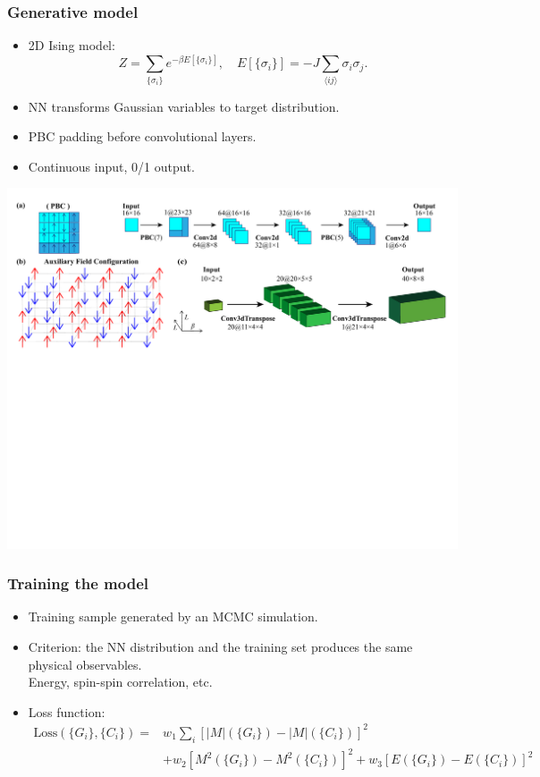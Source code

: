 \documentclass[xcolor=table, 10pt, aspectratio=169, ignorenonframetext]{beamer}
\begin{document}
\begin{frame}
  \frametitle{Generative model}
  \begin{itemize}
  \item 2D Ising model:
    \[Z=\sum_{\{\sigma_i\}}e^{-\beta E[\{\sigma_i\}]},\quad
      E[\{\sigma_i\}]=-J\sum_{\langle ij\rangle} \sigma_i\sigma_j.\]
  \item NN transforms Gaussian variables to target distribution.
  \item PBC padding before convolutional layers.
  \item Continuous input, 0/1 output.
  \end{itemize}
  \begin{center}
    \includegraphics[width=14cm]{nn-model1}
  \end{center}
\end{frame}

\begin{frame}
  \frametitle{Training the model}
  \begin{itemize}
  \item Training sample generated by an MCMC simulation.
  \item Criterion: the NN distribution and the training set produces the same physical observables.\\
    Energy, spin-spin correlation, etc.
  \item Loss function:
    \begin{align*}
      \text{Loss}(\{G_i\},\{C_i\})=&w_1\sum_i[|M|(\{G_i\})-|M|(\{C_i\})]^2\\
      &+w_2 [M^2(\{G_i\})-M^2(\{C_i\})]^2+w_3 [E(\{G_i\})-E(\{C_i\})]^2
    \end{align*}

  \end{itemize}
\end{frame}
\end{document}
